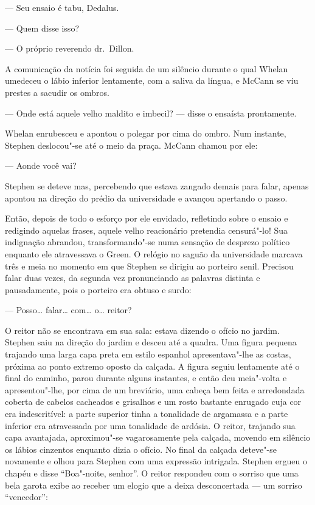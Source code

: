 --- Seu ensaio é tabu, Dedalus.

--- Quem disse isso?

--- O próprio reverendo dr.~Dillon.

A comunicação da notícia foi seguida de um silêncio durante o qual
Whelan umedeceu o lábio inferior lentamente, com a saliva da língua, e
McCann se viu prestes a sacudir os ombros.

--- Onde está aquele velho maldito e imbecil? --- disse o ensaísta
prontamente.

Whelan enrubesceu e apontou o polegar por cima do ombro.  Num
instante, Stephen deslocou"-se até o meio da praça.  McCann chamou por
ele:

--- Aonde você vai?

Stephen se deteve mas, percebendo que estava zangado demais para
falar, apenas apontou na direção do prédio da universidade e avançou
apertando o passo.

Então, depois de todo o esforço por ele envidado, refletindo sobre o
ensaio e redigindo aquelas frases, aquele velho reacionário pretendia
censurá"-lo!  Sua indignação abrandou, transformando"-se numa sensação de
desprezo político enquanto ele atravessava o Green.  O relógio no
saguão da universidade marcava três e meia no momento em que Stephen se
dirigiu ao porteiro \label{senil} senil.  Precisou falar duas vezes, da segunda vez
pronunciando as palavras distinta e pausadamente, pois o porteiro era
obtuso e surdo:

--- Posso\ldots{} falar\ldots{} com\ldots{} o\ldots{} reitor?

O reitor não se encontrava em sua sala: estava dizendo o ofício no
jardim.  Stephen saiu na direção do jardim e desceu até a quadra.  Uma
figura pequena trajando uma larga capa preta em estilo espanhol
apresentava"-lhe as costas, próxima ao ponto extremo oposto da calçada.
A figura seguiu lentamente até o final do caminho, parou durante alguns
instantes, e então deu meia"-volta e apresentou"-lhe, por cima de um
breviário, uma cabeça bem feita e arredondada coberta de cabelos
cacheados e grisalhos e um rosto bastante enrugado cuja cor era
indescritível: a parte superior tinha a tonalidade de argamassa e a
parte inferior era atravessada por uma tonalidade de ardósia.  O
reitor, trajando sua capa avantajada, aproximou"-se vagarosamente pela
calçada, movendo em silêncio os lábios cinzentos enquanto dizia o
ofício.  No final da calçada deteve"-se novamente e olhou para Stephen
com uma expressão intrigada.  Stephen ergueu o chapéu e disse “Boa"-noite,
senhor”.  O reitor respondeu com o sorriso que uma bela garota
exibe ao receber um elogio que a deixa desconcertada --- um sorriso
“vencedor”:

